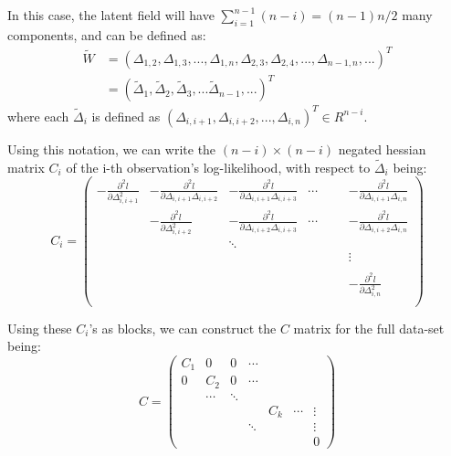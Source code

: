 \documentclass[]{article}
\begin{document}
In this case, the latent field will have
\(\sum_{i=1}^{n-1}(n-i) = (n-1)n/2\) many components, and can be defined
as: \begin{equation}\begin{aligned}\label{eqn:latenforpartial}
\tilde{W} &= (\Delta_{1,2},\Delta_{1,3},...,\Delta_{1,n},\Delta_{2,3},\Delta_{2,4},...,\Delta_{n-1,n},...)^T \\
          &= (\tilde{\Delta}_1,\tilde{\Delta}_2,\tilde{\Delta}_3,...\tilde{\Delta}_{n-1},...)^T
\end{aligned}\end{equation} where each \(\tilde{\Delta}_i\) is defined
as \((\Delta_{i,i+1},\Delta_{i,i+2},...,\Delta_{i,n})^T \in R^{n-i}\).

Using this notation, we can write the \((n-i)\times(n-i)\) negated
hessian matrix \(C_i\) of the i-th observation's log-likelihood, with
respect to \(\tilde{\Delta}_i\) being: \begin{equation}
C_i = \begin{pmatrix} 
-\frac{\partial^2 l}{\partial \Delta_{i,i+1}^2} & -\frac{\partial^2 l}{\partial \Delta_{i,i+1} \Delta_{i,i+2}} & -\frac{\partial^2 l}{\partial \Delta_{i,i+1} \Delta_{i,i+3}} & \cdots & & & -\frac{\partial^2 l}{\partial \Delta_{i,i+1} \Delta_{i,n}} \\ 
 & -\frac{\partial^2 l}{\partial \Delta_{i,i+2}^2} & -\frac{\partial^2 l}{\partial \Delta_{i,i+2} \Delta_{i,i+3}} & \cdots & & & -\frac{\partial^2 l}{\partial \Delta_{i,i+2} \Delta_{i,n}} \\
  &  & \ddots &  & & \\
& & & &  & & \vdots \\ 
& & & &  & & \\
& & & & & & -\frac{\partial^2 l}{\partial \Delta_{i,n}^2}\\
\end{pmatrix}
\end{equation}

Using these \(C_i\)'s as blocks, we can construct the \(C\) matrix for
the full data-set being: \begin{equation}
C = \begin{pmatrix} 
C_1 & 0 & 0 & \cdots & & \\ 
0 & C_2 & 0 & \cdots & & \\
  & \cdots & \ddots &  & & \\
& & & & C_k & \cdots & \vdots \\ 
& & & \ddots & &&\vdots \\
& & & & & & 0
\end{pmatrix}
\end{equation}
\end{document}

